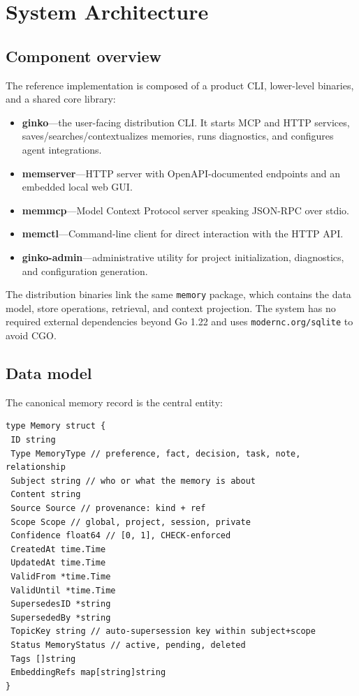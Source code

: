 \documentclass[11pt,a4paper]{article}
\begin{document}
\section{System Architecture}

\subsection{Component overview}

The reference implementation is composed of a product CLI, lower-level binaries, and a shared core library:

\begin{itemize}
 \item \textbf{ginko}---the user-facing distribution CLI. It starts MCP and HTTP services, saves/searches/contextualizes memories, runs diagnostics, and configures agent integrations.
 \item \textbf{memserver}---HTTP server with OpenAPI-documented endpoints and an embedded local web GUI.
 \item \textbf{memmcp}---Model Context Protocol server speaking JSON-RPC over stdio.
 \item \textbf{memctl}---Command-line client for direct interaction with the HTTP API.
 \item \textbf{ginko-admin}---administrative utility for project initialization, diagnostics, and configuration generation.
\end{itemize}

The distribution binaries link the same \texttt{memory} package, which contains the data model, store operations, retrieval, and context projection. The system has no required external dependencies beyond Go 1.22 and uses \texttt{modernc.org/sqlite} to avoid CGO.

\subsection{Data model}

The canonical memory record is the central entity:

\begin{lstlisting}[style=go]
type Memory struct {
 ID string
 Type MemoryType // preference, fact, decision, task, note, relationship
 Subject string // who or what the memory is about
 Content string
 Source Source // provenance: kind + ref
 Scope Scope // global, project, session, private
 Confidence float64 // [0, 1], CHECK-enforced
 CreatedAt time.Time
 UpdatedAt time.Time
 ValidFrom *time.Time
 ValidUntil *time.Time
 SupersedesID *string
 SupersededBy *string
 TopicKey string // auto-supersession key within subject+scope
 Status MemoryStatus // active, pending, deleted
 Tags []string
 EmbeddingRefs map[string]string
}
\end{lstlisting}
\end{document}
